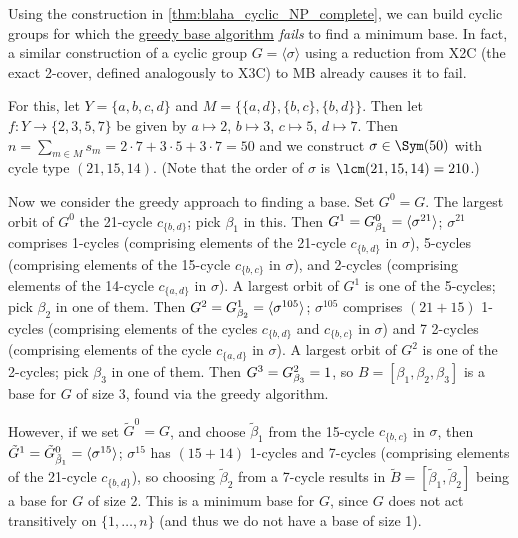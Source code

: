\begin{remark}\label{rem:blaha_cyclic_greedy}
    Using the construction in \autoref{thm:blaha_cyclic_NP_complete}, we can build cyclic groups for which the \hyperref[alg:blaha_greedy_base]{greedy base algorithm} \textit{fails} to find a minimum base. In fact, a similar construction of a cyclic group $G = \langle \sigma \rangle$ using a reduction from X2C (the exact 2-cover, defined analogously to X3C) to MB already causes it to fail.

    For this, let $Y = \{a,b,c,d\}$ and $M = \{\{a,d\},\{b,c\},\{b,d\}\}$. Then let $f : Y \to \{2,3,5,7\}$ be given by $a \mapsto 2$, $b \mapsto 3$, $c \mapsto 5$, $d \mapsto 7$. Then $n = \sum_{m \in M} s_m = 2 \cdot 7 + 3 \cdot 5 + 3 \cdot 7 = 50$ and we construct $\sigma \in \Sym(50)$ with cycle type $(21,15,14)$. (Note that the order of $\sigma$ is $\lcm(21,15,14) = 210$.) 

    Now we consider the greedy approach to finding a base. Set $G^0 = G$. The largest orbit of $G^0$  the 21-cycle $c_{\{b,d\}}$; pick $\beta_1$ in this. Then $G^1 = \added{2}{G^0_{\beta_1}} = \langle \sigma^{21} \rangle$; $\sigma^{21}$ comprises  1-cycles (comprising elements of the 21-cycle $c_{\{b,d\}}$ in $\sigma$),  5-cycles (comprising elements of the 15-cycle $c_{\{b,c\}}$ in $\sigma$), and  2-cycles (comprising elements of the 14-cycle $c_{\{a,d\}}$ in $\sigma$). A largest orbit of $G^1$ is one of the 5-cycles; pick $\beta_2$ in one of them. Then $G^2 = \added{2}{G^1_{\beta_2}} = \langle \sigma^{105} \rangle$; $\sigma^{105}$ comprises $(21 + 15)$ 1-cycles (comprising elements of the cycles $c_{\{b,d\}}$ and $c_{\{b,c\}}$ in $\sigma$) and 7 2-cycles (comprising elements of the cycle $c_{\{a,d\}}$ in $\sigma$). A largest orbit of $G^2$ is one of the 2-cycles; pick $\beta_3$ in one of them. Then $G^3 = \added{2}{G^2_{\beta_3}} = 1$, so $B = [\beta_1,\beta_2,\beta_3]$ is a base for $G$ of size 3, found via the greedy algorithm.

    However, if we set $\tilde G^0 = G$, and choose $\tilde\beta_1$ from the 15-cycle $c_{\{b,c\}}$ in $\sigma$, then $\tilde G^1 = \added{2}{\tilde G^0_{\tilde\beta_1}} = \langle \sigma^{15} \rangle$; $\sigma^{15}$ has $(15 + 14)$ 1-cycles and  7-cycles (comprising elements of the 21-cycle $c_{\{b,d\}}$), so choosing $\tilde\beta_2$ from a 7-cycle results in $\tilde B = [\tilde\beta_1,\tilde\beta_2]$ being a base for $G$ of size 2. This is a minimum base for $G$, since $G$ does not act transitively on $\{1,\dotsc,n\}$ (and thus we do not have a base of size 1).
\end{remark}

